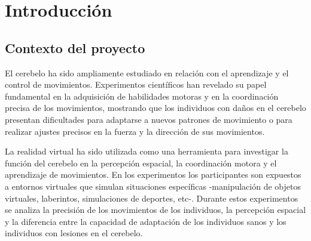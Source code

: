 \documentclass[a4paper,11pt, oneside]{book}
\begin{document}


%

%
%
%
%
%
%
%
%
%
%
%
%
%
%
%
%
%
%
%
%
%
%
\tableofcontents


\chapter{Introducción}

\section{Contexto del proyecto}

El cerebelo ha sido ampliamente estudiado en relación con el aprendizaje y el control de movimientos. Experimentos científicos han revelado su papel fundamental en la adquisición de habilidades motoras y en la coordinación precisa de los movimientos, mostrando que los individuos con daños en el cerebelo presentan dificultades para adaptarse a nuevos patrones de movimiento o para realizar ajustes precisos en la fuerza y la dirección de sus movimientos.

La realidad virtual ha sido utilizada como una herramienta para investigar la función del cerebelo en la percepción espacial, la coordinación motora y el aprendizaje de movimientos. En los experimentos los participantes son expuestos a entornos virtuales que simulan situaciones específicas -manipulación de objetos virtuales, laberintos, simulaciones de deportes, etc-. Durante estos experimentos se analiza la precisión de los movimientos de los individuos, la percepción espacial y la diferencia entre la capacidad de adaptación de los individuos sanos y los individuos con lesiones en el cerebelo.
\end{document}
